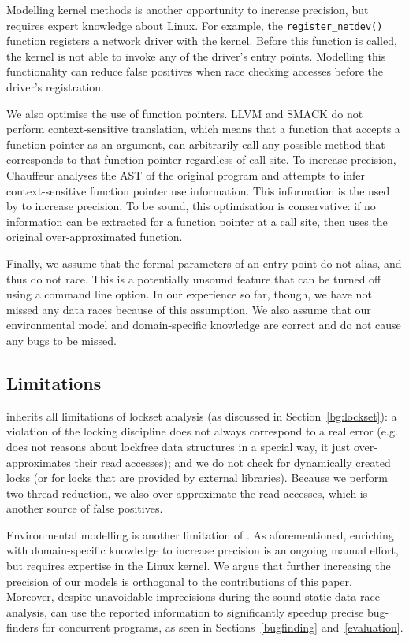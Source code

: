 Modelling kernel methods is another opportunity to increase precision, but requires expert knowledge about Linux. For example, the \texttt{register\_netdev()} function registers a network driver with the kernel. Before this function is called, the kernel is not able to invoke any of the driver's entry points. Modelling this functionality can reduce false positives when race checking accesses before the driver's registration.

We also optimise the use of function pointers. LLVM and SMACK do not perform context-sensitive translation, which means that a function that accepts a function pointer as an argument, can arbitrarily call any possible method that corresponds to that function pointer regardless of call site. To increase precision, Chauffeur analyses the AST of the original program and attempts to infer context-sensitive function pointer use information. This information is the used by \whoop to increase precision. To be sound, this optimisation is conservative: if no information can be extracted for a function pointer at a call site, then \whoop uses the original over-approximated function.

Finally, we assume that the formal parameters of an entry point do not alias, and thus do not race. This is a potentially unsound feature that can be turned off using a command line option. In our experience so far, though, we have not missed any data races because of this assumption. We also assume that our environmental model and domain-specific knowledge are correct and do not cause any bugs to be missed.

\subsection{Limitations}
\label{tech:limitations}

\whoop inherits all limitations of lockset analysis (as discussed in Section~\ref{bg:lockset}): a violation of the locking discipline does not always correspond to a real error (e.g. \whoop does not reasons about lockfree data structures in a special way, it just over-approximates their read accesses); and we do not check for dynamically created locks (or for locks that are provided by external libraries). Because we perform two thread reduction, we also over-approximate the read accesses, which is another source of false positives.

Environmental modelling is another limitation of \whoop. As aforementioned, enriching \whoop with domain-specific knowledge to increase precision is an ongoing manual effort, but requires expertise in the Linux kernel. We argue that further increasing the precision of our models is orthogonal to the contributions of this paper. Moreover, despite unavoidable imprecisions during the sound static data race analysis, \whoop can use the reported information to significantly speedup precise bug-finders for concurrent programs, as seen in Sections~\ref{bugfinding} and~\ref{evaluation}.